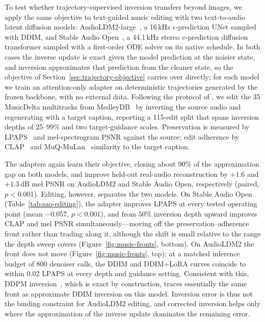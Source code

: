\documentclass{article} %
\begin{document}
To test whether trajectory-supervised inversion transfers beyond images, we apply the same objective to text-guided music editing with two text-to-audio latent diffusion models: AudioLDM2-large~\citep{audioldm2}, a 16\,kHz $\epsilon$-prediction UNet sampled with DDIM, and Stable Audio Open~\citep{stableaudioopen}, a 44.1\,kHz stereo $v$-prediction diffusion transformer sampled with a first-order ODE solver on its native schedule. In both cases the inverse update is exact given the model prediction at the noisier state, and inversion approximates that prediction from the cleaner state, so the objective of Section~\ref{sec:trajectory-objective} carries over directly; for each model we train an attention-only adapter on deterministic trajectories generated by the frozen backbone, with no external data. Following the protocol of \citet{manor2024zeroshot}, we edit the 35 MusicDelta multitracks from MedleyDB~\citep{medleydb} by inverting the source audio and regenerating with a target caption, reporting a 115-edit split that spans inversion depths of 25--99\% and two target-guidance scales. Preservation is measured by LPAPS~\citep{manor2024zeroshot} and mel-spectrogram PSNR against the source; edit adherence by CLAP~\citep{laionclap} and MuQ-MuLan~\citep{muq} similarity to the target caption.

The adapters again learn their objective, closing about $90\%$ of the approximation gap on both models, and improve held-out real-audio reconstruction by $+1.6$ and $+1.3$\,dB mel PSNR on AudioLDM2 and Stable Audio Open, respectively (paired, $p<0.001$). Editing, however, separates the two models. On Stable Audio Open (Table~\ref{tab:sao-editing}), the adapter improves LPAPS at every tested operating point (mean $-0.057$, $p<0.001$), and from $50\%$ inversion depth upward improves CLAP and mel PSNR simultaneously---moving off the preservation--adherence front rather than trading along it, although the shift is small relative to the range the depth sweep covers (Figure~\ref{fig:music-fronts}, bottom). On AudioLDM2 the front does not move (Figure~\ref{fig:music-fronts}, top): at a matched inference budget of 800 denoiser calls, the DDIM and DDIM+LoRA curves coincide to within $0.02$ LPAPS at every depth and guidance setting. Consistent with this, DDPM inversion~\citep{huberman2024edit,manor2024zeroshot}, which is exact by construction, traces essentially the same front as approximate DDIM inversion on this model. Inversion error is thus not the binding constraint for AudioLDM2 editing, and corrected inversion helps only where the approximation of the inverse update dominates the remaining error.
\end{document}
